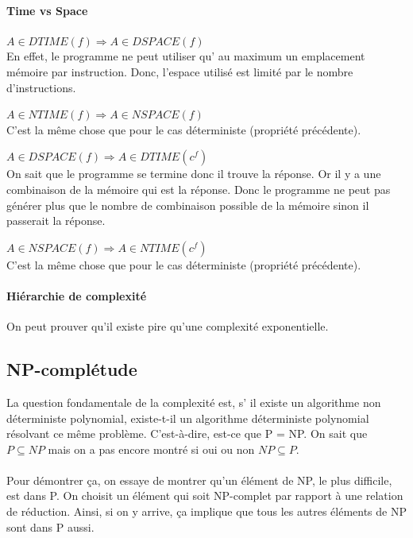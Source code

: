 \paragraph{Time vs Space}
\begin{myprop}
	$A \in DTIME(f) \Rightarrow A \in DSPACE(f)$ \\
	En effet, le programme ne peut utiliser qu’ au maximum un emplacement
	mémoire par instruction. Donc, l'espace utilisé est limité par le
	nombre d'instructions.
\end{myprop}

\begin{myprop}
	$A \in NTIME(f) \Rightarrow A \in NSPACE(f)$ \\
	C'est la même chose que pour le cas déterministe (propriété précédente).
\end{myprop}

\begin{myprop}
	$A \in DSPACE(f) \Rightarrow A \in DTIME(c^f)$ \\
	On sait que le programme se termine donc il trouve la réponse. Or il y
	a une combinaison de la mémoire qui est la réponse. Donc le programme
	ne peut pas générer plus que le nombre de combinaison possible de la
	mémoire sinon il passerait la réponse.
\end{myprop}

\begin{myprop}
	$A \in NSPACE(f) \Rightarrow A \in NTIME(c^f)$ \\
	C'est la même chose que pour le cas déterministe (propriété précédente).
\end{myprop}

\paragraph{Hiérarchie de complexité}
On peut prouver qu'il existe pire qu'une complexité exponentielle.

\subsection{NP-complétude}
La question fondamentale de la complexité est, s’ il existe un algorithme
non déterministe polynomial, existe-t-il un algorithme déterministe polynomial
résolvant ce même problème. C'est-à-dire, est-ce que P = NP. On sait que $P
\subseteq NP$ mais on a pas encore montré si oui ou non $NP\subseteq P$.

\paragraph{} Pour démontrer ça, on essaye de montrer qu'un élément de NP, le
plus difficile, est dans P. On choisit un élément qui soit NP-complet par
rapport à une relation de réduction. Ainsi, si on y arrive, ça implique que
tous les autres éléments de NP sont dans P aussi.

